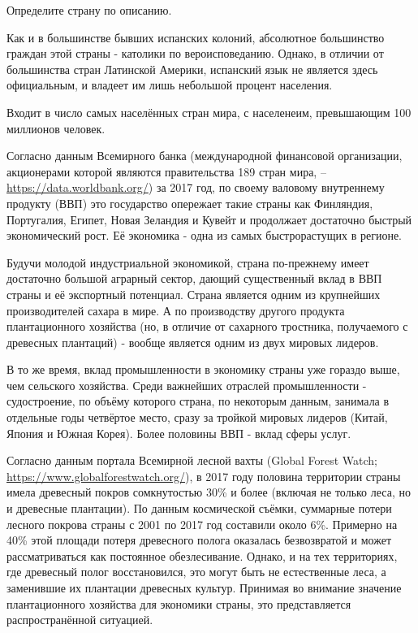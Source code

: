 
Определите страну по описанию.

Как и в большинстве бывших испанских колоний, абсолютное большинство граждан этой страны - католики по вероисповеданию. Однако, в отличии от большинства стран Латинской Америки, испанский язык не является здесь официальным, и владеет им лишь небольшой процент населения.

Входит в число самых населённых стран мира, с населенеим, превышающим 100 миллионов человек.

Согласно данным Всемирного банка (международной финансовой организации, акционерами которой являются правительства 189 стран мира, – \url{https://data.worldbank.org/}) за 2017 год, по своему валовому внутреннему продукту (ВВП) это государство опережает такие страны как Финляндия, Португалия, Египет, Новая Зеландия и Кувейт и продолжает достаточно быстрый экономический рост. Её экономика - одна из самых быстрорастущих в регионе.

Будучи молодой индустриальной экономикой, страна по-прежнему имеет достаточно большой аграрный сектор, дающий существенный вклад в ВВП страны и её экспортный потенциал. Страна является одним из крупнейших производителей сахара в мире. А по производству другого продукта плантационного хозяйства (но, в отличие от сахарного тростника, получаемого с древесных плантаций) - вообще является одним из двух мировых лидеров.

В то же время, вклад промышленности в экономику страны уже гораздо выше, чем сельского хозяйства. Среди важнейших отраслей промышленности - судостроение, по объёму которого страна, по некоторым данным, занимала в отдельные годы четвёртое место, сразу за тройкой мировых лидеров (Китай, Япония и Южная Корея). Более половины ВВП - вклад сферы услуг.

Согласно данным портала Всемирной лесной вахты (Global Forest Watch; \url{https://www.globalforestwatch.org/}), в 2017 году половина территории страны имела древесный покров сомкнутостью 30\% и более (включая не только леса, но и древесные плантации). По данным космической съёмки, суммарные потери лесного покрова страны с 2001 по 2017 год составили около 6\%. Примерно на 40\% этой площади потеря древесного полога оказалась безвозвратой и может рассматриваться как постоянное обезлесивание. Однако, и на тех территориях, где древесный полог восстановился, это могут быть не естественные леса, а заменившие их плантации древесных культур. Принимая во внимание значение плантационного хозяйства для экономики страны, это представляется распространённой ситуацией.

